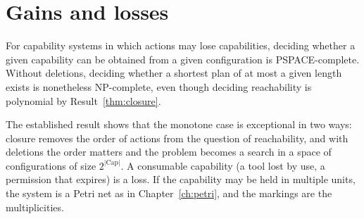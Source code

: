 \section{Gains and losses}

\begin{established}\label{thm:bylander}
For capability systems in which actions may lose capabilities, deciding whether a given capability can be obtained from a given configuration is PSPACE-complete. Without deletions, deciding whether a shortest plan of at most a given length exists is nonetheless NP-complete, even though deciding reachability is polynomial by Result~\ref{thm:closure}.
\end{established}

The established result shows that the monotone case is exceptional in two ways: closure removes the order of actions from the question of reachability, and with deletions the order matters and the problem becomes a search in a space of configurations of size $2^{|\mathrm{Cap}|}$. A consumable capability (a tool lost by use, a permission that expires) is a loss. If the capability may be held in multiple units, the system is a Petri net as in Chapter~\ref{ch:petri}, and the markings are the multiplicities.

